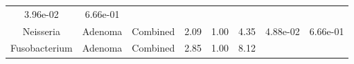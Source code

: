 \documentclass[12pt,]{article}
\begin{document}
\begin{longtable}[]{@{}cccccccc@{}}
\begin{minipage}[t]{0.06\columnwidth}
3.96e-02\strut
\end{minipage} & \begin{minipage}[t]{0.06\columnwidth}\centering\strut
6.66e-01\strut
\end{minipage}\tabularnewline
\begin{minipage}[t]{0.18\columnwidth}\centering\strut
Neisseria\strut
\end{minipage} & \begin{minipage}[t]{0.07\columnwidth}\centering\strut
Adenoma\strut
\end{minipage} & \begin{minipage}[t]{0.09\columnwidth}\centering\strut
Combined\strut
\end{minipage} & \begin{minipage}[t]{0.03\columnwidth}\centering\strut
2.09\strut
\end{minipage} & \begin{minipage}[t]{0.14\columnwidth}\centering\strut
1.00\strut
\end{minipage} & \begin{minipage}[t]{0.14\columnwidth}\centering\strut
4.35\strut
\end{minipage} & \begin{minipage}[t]{0.06\columnwidth}\centering\strut
4.88e-02\strut
\end{minipage} & \begin{minipage}[t]{0.06\columnwidth}\centering\strut
6.66e-01\strut
\end{minipage}\tabularnewline
\begin{minipage}[t]{0.18\columnwidth}\centering\strut
Fusobacterium\strut
\end{minipage} & \begin{minipage}[t]{0.07\columnwidth}\centering\strut
Adenoma\strut
\end{minipage} & \begin{minipage}[t]{0.09\columnwidth}\centering\strut
Combined\strut
\end{minipage} & \begin{minipage}[t]{0.03\columnwidth}\centering\strut
2.85\strut
\end{minipage} & \begin{minipage}[t]{0.14\columnwidth}\centering\strut
1.00\strut
\end{minipage} & \begin{minipage}[t]{0.14\columnwidth}\centering\strut
8.12\strut
\end{minipage} & \begin{minipage}[t]{0.06\columnwidth}\centering\strut

\end{minipage}
\end{longtable}
\end{document}
